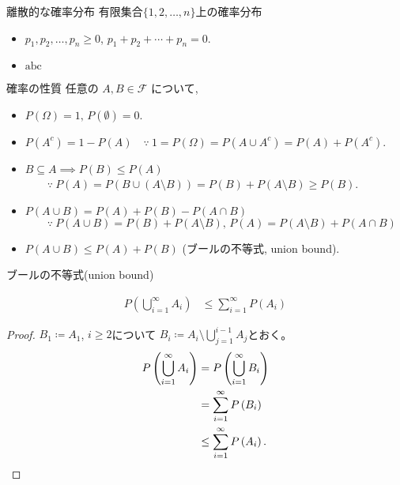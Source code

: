 \documentclass[lualatex,handout]{beamer}
\theoremstyle{definition}
\begin{document}
\begin{frame}{離散的な確率分布}
有限集合$\{1,2,\dotsc,n\}$上の確率分布
\begin{itemize}
\item $p_1, p_2, \dotsc, p_n\ge 0$, $p_1+p_2+\dotsb+p_n=0$.
\item $\mathrm{abc}$
\end{itemize}
\end{frame}
\fi

\begin{frame}{確率の性質}
任意の $A,B\in\mathcal{F}$ について,
\begin{itemize}
\setlength{\itemsep}{1em}
\item $P(\Omega)=1,\,P(\emptyset)=0$.
\item $P(A^c) = 1 - P(A) \quad\because\ 1 = P(\Omega) = P(A\cup A^c) = P(A) + P(A^c)$.
\item $B\subseteq A\implies P(B) \le P(A)$\\
$\qquad \because\ P(A) = P(B\cup (A\setminus B)) = P(B) + P(A\setminus B)\ge P(B)$.
\item $P(A\cup B) = P(A) + P(B) - P(A\cap B)$\\
$\qquad \because\ P(A\cup B) = P(B) + P(A\setminus B),\, P(A) = P(A\setminus B) + P(A\cap B)$
\item $P(A\cup B) \le P(A) + P(B)$ (ブールの不等式, union bound).
\end{itemize}
\end{frame}

\begin{frame}{ブールの不等式(union bound)}
\begin{theorem}
\begin{align*}
P\left(\bigcup_{i=1}^\infty A_i\right) &\le \sum_{i=1}^\infty P(A_i)
\end{align*}
\end{theorem}
\begin{proof}
$B_1\coloneq A_1$, $i\ge 2$について $B_i\coloneq A_i\setminus \bigcup_{j=1}^{i-1} A_j$とおく。
\begin{align*}
P\left(\bigcup_{i=1}^\infty A_i\right) &= P\left(\bigcup_{i=1}^\infty B_i\right)\\
&= \sum_{i=1}^\infty P\left(B_i\right)\\
&\le \sum_{i=1}^\infty P\left(A_i\right).\qedhere
\end{align*}
\end{proof}
\end{frame}
\end{document}
